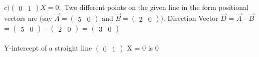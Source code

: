 \documentclass[journal,12pt,twocolumn]{IEEEtran}
\begin{document}
\\
\\
$
c) \begin{pmatrix} 0 & 1\end{pmatrix} X = 0,
$
Two different points on the given line in the form positional vectors are (say $\overrightarrow{A} = \begin{pmatrix} 5 & 0 \end{pmatrix} $ and $\overrightarrow{B} = \begin{pmatrix} 2 & 0 \end{pmatrix} $).
Direction Vector $\overrightarrow{D}$ = $\overrightarrow{A}$ - $\overrightarrow{B}$ = $\begin{pmatrix} 5 & 0 \end{pmatrix} $ - $\begin{pmatrix} 2 & 0 \end{pmatrix} $ = $\begin{pmatrix} 3 & 0 \end{pmatrix} $
\\
\\
Y-intercept of a straight line $\begin{pmatrix} 0 & 1\end{pmatrix}$ X = 0 is 0
\end{document}
